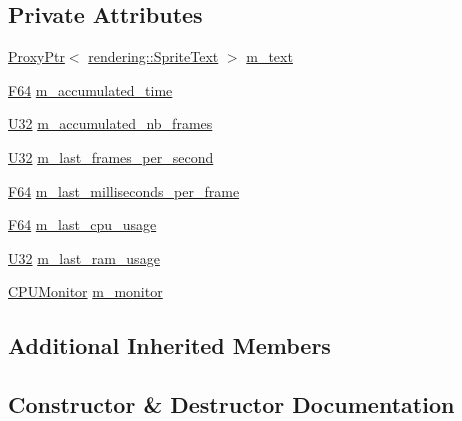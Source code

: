 \subsection*{Private Attributes}
\begin{DoxyCompactItemize}
\item 
\hyperlink{classmage_1_1_proxy_ptr}{Proxy\+Ptr}$<$ \hyperlink{classmage_1_1rendering_1_1_sprite_text}{rendering\+::\+Sprite\+Text} $>$ \hyperlink{classmage_1_1script_1_1_stats_script_a1fe11e7a3622fa5e3585fb6786e2d2e7}{m\+\_\+text}
\item 
\hyperlink{namespacemage_ad26233bbec640deda836e572c1a23708}{F64} \hyperlink{classmage_1_1script_1_1_stats_script_a41c1a4a0c73a6d5778b8ac7cd9d41bbc}{m\+\_\+accumulated\+\_\+time}
\item 
\hyperlink{namespacemage_a41c104c036fba3756a74e19f793eeaa1}{U32} \hyperlink{classmage_1_1script_1_1_stats_script_a7ef910aceb585af53110697ea5b3f810}{m\+\_\+accumulated\+\_\+nb\+\_\+frames}
\item 
\hyperlink{namespacemage_a41c104c036fba3756a74e19f793eeaa1}{U32} \hyperlink{classmage_1_1script_1_1_stats_script_a1ce1ed31e122346361d01cefb012e443}{m\+\_\+last\+\_\+frames\+\_\+per\+\_\+second}
\item 
\hyperlink{namespacemage_ad26233bbec640deda836e572c1a23708}{F64} \hyperlink{classmage_1_1script_1_1_stats_script_a6c531ad04b2fa2ce530af06914d362b9}{m\+\_\+last\+\_\+milliseconds\+\_\+per\+\_\+frame}
\item 
\hyperlink{namespacemage_ad26233bbec640deda836e572c1a23708}{F64} \hyperlink{classmage_1_1script_1_1_stats_script_aa139c88470e13a6af4c5d715107c32e6}{m\+\_\+last\+\_\+cpu\+\_\+usage}
\item 
\hyperlink{namespacemage_a41c104c036fba3756a74e19f793eeaa1}{U32} \hyperlink{classmage_1_1script_1_1_stats_script_a0ea0dcf90e4364af1f64d67024314a94}{m\+\_\+last\+\_\+ram\+\_\+usage}
\item 
\hyperlink{classmage_1_1_c_p_u_monitor}{C\+P\+U\+Monitor} \hyperlink{classmage_1_1script_1_1_stats_script_ae5b97f07da7adb0740cd68cf2c4abbf5}{m\+\_\+monitor}
\end{DoxyCompactItemize}
\subsection*{Additional Inherited Members}


\subsection{Constructor \& Destructor Documentation}
\hypertarget{classmage_1_1script_1_1_stats_script_a6863940cb48633fbd5fc56547dc72a76}{}\label{classmage_1_1script_1_1_stats_script_a6863940cb48633fbd5fc56547dc72a76} 
